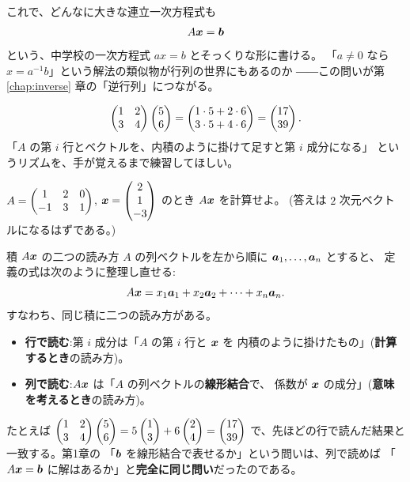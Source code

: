 これで、どんなに大きな連立一次方程式も
\[
A\bm{x} = \bm{b}
\]
という、中学校の一次方程式 $ax = b$ とそっくりな形に書ける。
「$a \neq 0$ なら $x = a^{-1}b$」という解法の類似物が行列の世界にもあるのか
――この問いが第 \ref{chap:inverse} 章の「逆行列」につながる。

\begin{rei}[計算の練習]
\[
\begin{pmatrix}1 & 2 \\ 3 & 4\end{pmatrix}\begin{pmatrix}5 \\ 6\end{pmatrix}
= \begin{pmatrix}1 \cdot 5 + 2 \cdot 6 \\ 3 \cdot 5 + 4 \cdot 6\end{pmatrix}
= \begin{pmatrix}17 \\ 39\end{pmatrix}.
\]
「$A$ の第 $i$ 行とベクトルを、内積のように掛けて足すと第 $i$ 成分になる」
というリズムを、手が覚えるまで練習してほしい。
\end{rei}

\begin{mondai}\label{q:matvec}  %
$A = \begin{pmatrix}1 & 2 & 0 \\ -1 & 3 & 1\end{pmatrix}$,
$\bm{x} = \begin{pmatrix}2 \\ 1 \\ -3\end{pmatrix}$ のとき $A\bm{x}$ を計算せよ。
(答えは $2$ 次元ベクトルになるはずである。)
\end{mondai}

\begin{itembox}[l]{積 $A\bm{x}$ の二つの読み方}
$A$ の列ベクトルを左から順に $\bm{a}_1, \dots, \bm{a}_n$ とすると、
定義の式は次のように整理し直せる:
\[
A\bm{x} = x_1 \bm{a}_1 + x_2 \bm{a}_2 + \cdots + x_n \bm{a}_n.
\]
すなわち、同じ積に二つの読み方がある。
\begin{itemize}
\item \textbf{行で読む}:第 $i$ 成分は「$A$ の第 $i$ 行と $\bm{x}$ を
内積のように掛けたもの」(\textbf{計算するとき}の読み方)。
\item \textbf{列で読む}:$A\bm{x}$ は「$A$ の列ベクトルの\textbf{線形結合}で、
係数が $\bm{x}$ の成分」(\textbf{意味を考えるとき}の読み方)。
\end{itemize}
たとえば
$\begin{pmatrix}1 & 2 \\ 3 & 4\end{pmatrix}\begin{pmatrix}5 \\ 6\end{pmatrix} = 5\begin{pmatrix}1 \\ 3\end{pmatrix} + 6\begin{pmatrix}2 \\ 4\end{pmatrix} = \begin{pmatrix}17 \\ 39\end{pmatrix}$
で、先ほどの行で読んだ結果と一致する。第1章の
「$\bm{b}$ を線形結合で表せるか」という問いは、列で読めば
「$A\bm{x} = \bm{b}$ に解はあるか」と\textbf{完全に同じ問い}だったのである。
\end{itembox}

